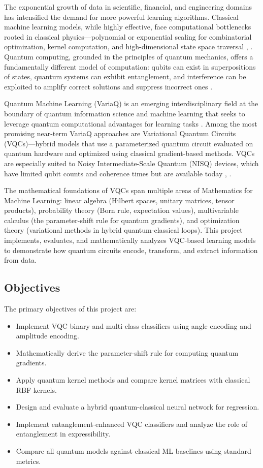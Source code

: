\documentclass[conference]{IEEEtran}
\begin{document}
The exponential growth of data in scientific, financial, and engineering domains has intensified the demand for more powerful learning algorithms. Classical machine learning models, while highly effective, face computational bottlenecks rooted in classical physics---polynomial or exponential scaling for combinatorial optimization, kernel computation, and high-dimensional state space traversal \cite{biamonte2017}, \cite{rebentrost2014}. Quantum computing, grounded in the principles of quantum mechanics, offers a fundamentally different model of computation: qubits can exist in superpositions of states, quantum systems can exhibit entanglement, and interference can be exploited to amplify correct solutions and suppress incorrect ones \cite{nielsen2010}.

Quantum Machine Learning (VariaQ) is an emerging interdisciplinary field at the boundary of quantum information science and machine learning that seeks to leverage quantum computational advantages for learning tasks \cite{schuld2021}. Among the most promising near-term VariaQ approaches are Variational Quantum Circuits (VQCs)---hybrid models that use a parameterized quantum circuit evaluated on quantum hardware and optimized using classical gradient-based methods. VQCs are especially suited to Noisy Intermediate-Scale Quantum (NISQ) devices, which have limited qubit counts and coherence times but are available today \cite{pennylane2022}, \cite{scikit2011}.

The mathematical foundations of VQCs span multiple areas of Mathematics for Machine Learning: linear algebra (Hilbert spaces, unitary matrices, tensor products), probability theory (Born rule, expectation values), multivariable calculus (the parameter-shift rule for quantum gradients), and optimization theory (variational methods in hybrid quantum-classical loops). This project implements, evaluates, and mathematically analyzes VQC-based learning models to demonstrate how quantum circuits encode, transform, and extract information from data.

\subsection{Objectives}

The primary objectives of this project are:
\begin{itemize}
  \item Implement VQC binary and multi-class classifiers using angle encoding and amplitude encoding.
  \item Mathematically derive the parameter-shift rule for computing quantum gradients.
  \item Apply quantum kernel methods and compare kernel matrices with classical RBF kernels.
  \item Design and evaluate a hybrid quantum-classical neural network for regression.
  \item Implement entanglement-enhanced VQC classifiers and analyze the role of entanglement in expressibility.
  \item Compare all quantum models against classical ML baselines using standard metrics.
\end{itemize}
\end{document}
